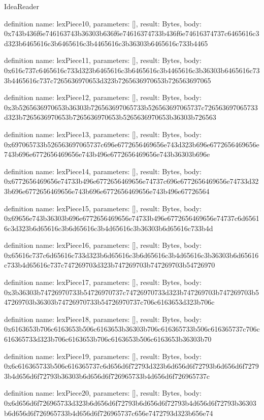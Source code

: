 \begin{lexlean}{IdeaReader}
\begin{semanticmodule}
definition{
  name: lexPiece10,
  parameters: [],
  result: Bytes,
  body: 0x743b436f6e746163743b36303b636f6e74616374733b436f6e74616374737c6465616c3d323b6465616c3b6465616c3b4465616c3b36303b6465616c733b4465
}

definition{
  name: lexPiece11,
  parameters: [],
  result: Bytes,
  body: 0x616c737c6465616c733d323b6465616c3b6465616c3b4465616c3b36303b6465616c733b4465616c737c7265636970653d323b7265636970653b726563697065
}

definition{
  name: lexPiece12,
  parameters: [],
  result: Bytes,
  body: 0x3b5265636970653b36303b726563697065733b526563697065737c726563697065733d323b7265636970653b7265636970653b5265636970653b36303b726563
}

definition{
  name: lexPiece13,
  parameters: [],
  result: Bytes,
  body: 0x697065733b526563697065737c696e6772656469656e743d323b696e6772656469656e743b696e6772656469656e743b496e6772656469656e743b36303b696e
}

definition{
  name: lexPiece14,
  parameters: [],
  result: Bytes,
  body: 0x6772656469656e74733b496e6772656469656e74737c696e6772656469656e74733d323b696e6772656469656e743b696e6772656469656e743b496e67726564
}

definition{
  name: lexPiece15,
  parameters: [],
  result: Bytes,
  body: 0x69656e743b36303b696e6772656469656e74733b496e6772656469656e74737c6d65616c3d323b6d65616c3b6d65616c3b4d65616c3b36303b6d65616c733b4d
}

definition{
  name: lexPiece16,
  parameters: [],
  result: Bytes,
  body: 0x65616c737c6d65616c733d323b6d65616c3b6d65616c3b4d65616c3b36303b6d65616c733b4d65616c737c747269703d323b747269703b747269703b54726970
}

definition{
  name: lexPiece17,
  parameters: [],
  result: Bytes,
  body: 0x3b36303b74726970733b54726970737c74726970733d323b747269703b747269703b547269703b36303b74726970733b54726970737c706c6163653d323b706c
}

definition{
  name: lexPiece18,
  parameters: [],
  result: Bytes,
  body: 0x6163653b706c6163653b506c6163653b36303b706c616365733b506c616365737c706c616365733d323b706c6163653b706c6163653b506c6163653b36303b70
}

definition{
  name: lexPiece19,
  parameters: [],
  result: Bytes,
  body: 0x6c616365733b506c616365737c6d656d6f72793d323b6d656d6f72793b6d656d6f72793b4d656d6f72793b36303b6d656d6f726965733b4d656d6f726965737c
}

definition{
  name: lexPiece20,
  parameters: [],
  result: Bytes,
  body: 0x6d656d6f726965733d323b6d656d6f72793b6d656d6f72793b4d656d6f72793b36303b6d656d6f726965733b4d656d6f726965737c656e7472793d323b656e74
}


\end{semanticmodule}
\end{lexlean}
